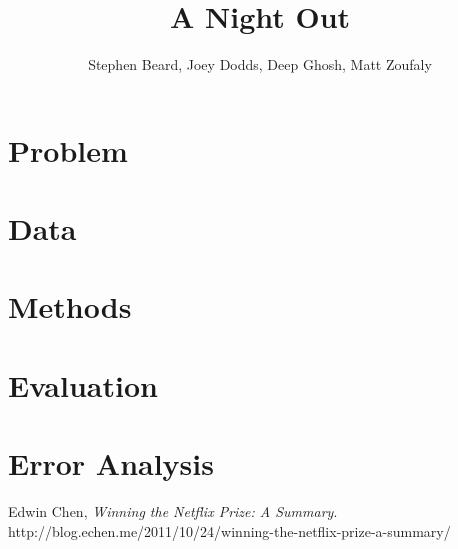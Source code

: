 \documentclass[12pt]{article}
\begin{document}

\title{A Night Out}
\author{Stephen Beard, Joey Dodds, Deep Ghosh, Matt Zoufaly}
\maketitle

\section{Problem}

\newcommand{\bestRMSE}{0.9307 }
\newcommand{\bestRMSEnsp}{0.9307}
\newcommand{\bestK}{48 }
\newcommand{\bestNetflixRMSE}{0.8712 }
\newcommand{\bestNetflixRMSEnsp}{0.8712}
\newcommand{\netDiff}{0.06 }

\newcommand{\numBusCA}{707 } 
\newcommand{\numBusTotal}{2,452 }
\newcommand{\numUserTotal}{??? }

\newcommand{\numRatingCA}{8,970 } 
\newcommand{\numRatingTotal}{28,310 }

\section{Data}


\section{Methods}


\section{Evaluation}


\section{Error Analysis}


\begin{thebibliography}{9}

  Edwin Chen,
  \emph{Winning the Netflix Prize: A Summary}.
  http://blog.echen.me/2011/10/24/winning-the-netflix-prize-a-summary/
\end{thebibliography}
\end{document}
